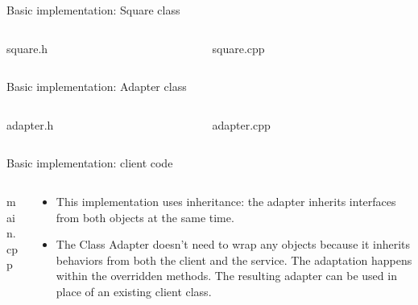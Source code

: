 \documentclass[13pt]{beamer}
\begin{document}
\begin{frame}{Basic implementation: Square class}
\begin{columns}[T]
\begin{column}{.45\textwidth}
\lstset{basicstyle=\tiny,style=myCustomCppStyle}
square.h

\end{column}

\begin{column}{.45\textwidth}
\lstset{basicstyle=\tiny,style=myCustomCppStyle}
square.cpp

\end{column}
\end{columns}
\end{frame}

\begin{frame}{Basic implementation: Adapter class}
\begin{columns}[T]
\begin{column}{.45\textwidth}
\lstset{basicstyle=\tiny,style=myCustomCppStyle}
adapter.h

\end{column}

\begin{column}{.45\textwidth}
\lstset{basicstyle=\tiny,style=myCustomCppStyle}
adapter.cpp

\end{column}
\end{columns}
\end{frame}

\begin{frame}{Basic implementation: client code}
\begin{columns}[T]
\begin{column}{.45\textwidth}
	\lstset{basicstyle=\tiny,style=myCustomCppStyle}
	main.cpp
	
\end{column}

\begin{column}{.5\textwidth}
	\lstset{basicstyle=\tiny,style=myCustomCppStyle}
	\begin{itemize}
		\item This implementation uses inheritance: the adapter inherits interfaces from both objects at the same time.
		\item The Class Adapter doesn’t need to wrap any objects because it inherits behaviors from both the client and the service. The adaptation happens within the overridden methods. The resulting adapter can be used in place of an existing client class.
	\end{itemize}
\end{column}
\end{columns}
\end{frame}
\end{document}
